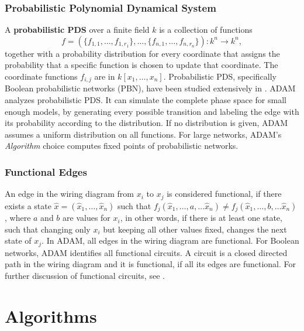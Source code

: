 \documentclass[11pt]{amsart}
\begin{document}
\subsubsection{Probabilistic Polynomial Dynamical System}
A {\bf probabilistic PDS} over a finite field $k$ is a collection of functions
$$f = (\{f_{1,1}, \ldots, f_{1, r_1}\}, \ldots, \{f_{n, 1}, \ldots, f_{n, r_n}
\}) : k^n \rightarrow k^n,$$
together with a probability distribution for every coordinate that assigns the
probability that a specific function is chosen to update that coordinate.
The coordinate functions $f_{i,j}$ are in $k[x_1, \ldots , x_n]$.
Probabilistic PDS, specifically Boolean probabilistic networks (PBN), have been studied
extensively in \cite{shmulevich}.
ADAM analyzes probabilistic PDS. It can simulate the
complete phase space for small enough models, by generating every possible
transition and labeling the edge with its probability according to the
distribution. If no distribution is given, ADAM assumes a uniform distribution
on all functions. For large networks, ADAM's {\it Algorithm} choice computes
fixed points of probabilistic networks.
\subsubsection{Functional Edges} \label{sec:func}
An edge in the wiring diagram from $x_i$ to $x_j$ is considered
functional, if there exists a state $\hat x = (\hat x_1,  \ldots, \hat x_n)$ such
that $f_j( \hat x_1,  \ldots, a, \ldots \hat x_n) \neq f_j(\hat x_1, \ldots, b, \ldots
\hat x_n)$, where $a$ and $b$ are values for $x_i$, in other words, if there
is at least one state, such that changing only $x_i$ but keeping all other
values fixed, changes the next state of $x_j$.
In ADAM, all edges in the wiring diagram are functional.
For Boolean networks, ADAM identifies all functional circuits. A circuit is a
closed directed path in the wiring diagram and it is functional, if all its
edges are functional. For further discussion of
functional circuits, see \cite{Chaouiya}.
\section{Algorithms}
\end{document}
